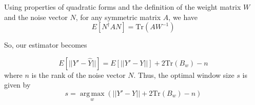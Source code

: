 Using properties of quadratic forms and the definition of the weight matrix $W$ and the noise vector $N$, for any symmetric matrix $A$, we have
\begin{equation}
    E[N^\dagger A N] = \mathrm{Tr}(AW^{-1})
\end{equation}

So, our estimator becomes

\begin{equation}
    E[||Y'-\hat{Y}||] = E[||Y'-Y||] + 2 \mathrm{Tr}(B_w) - n
\end{equation}
where $n$ is the rank of the noise vector $N$. Thus, the optimal window size $s$ is given by
\begin{equation}
    s = \operatorname*{arg\,max}_w \left(||Y'-Y|| + 2 \mathrm{Tr}(B_w) - n\right)
\end{equation}